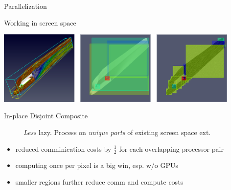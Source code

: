 \documentclass[notes]{beamer}
\begin{document}
\begin{frame}{Parallelization}
  \vspace{-0.05in}
\begin{beamerboxesrounded}{Working in screen space}
  \begin{center}
  \includegraphics[width=4.75in]{shuttle-inplace-disj.png}\vspace{0.1in}\\
  \end{center}
  \vspace{-0.15in}
  \begin{description}
  \item [In-place Disjoint Composite]{\it Less} lazy. Process on {\it unique parts} of existing screen space ext.
  \end{description}
  \vspace{-0.1in}
  \begin{minipage}{0.5\linewidth}
  \begin{itemize}
  \setlength{\itemindent}{-1em}
  \footnotesize 
  \item[\color{green}{\Checkmark}] reduced comminication costs by $\frac{1}{2}$ for each overlapping processor pair
  \item[\color{green}{\Checkmark}] computing once per pixel is a big win, esp. w/o GPUs
  \item[\color{green}{\Checkmark}] smaller regions further reduce comm and compute costs
  \end{itemize}
  \end{minipage}
  \begin{minipage}{0.5\linewidth}
  \end{minipage}
  \end{beamerboxesrounded}
\end{frame}
\end{document}
